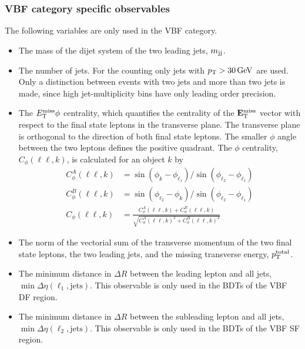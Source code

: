 \subsubsection{VBF category specific observables}
The following variables are only used in the VBF category.
\begin{itemize}
    \item The mass of the dijet system of the two leading jets, $m_{\text{jj}}$.
    \item The number of jets. For the counting only jets with $\pt > \SI{30}{\GeV}$ are used.
          Only a distinction between events with two jets and more than two jets is made, since high jet-multiplicity bins
          have only leading order precision.
    \item The $E_\text{T}^\text{miss} \phi$ centrality, which quantifies the centrality of the $\mathbf{E}_\text{T}^\text{miss}$ vector with respect to the final
          state leptons in the transverse plane.
          The transverse plane is orthogonal to the direction of both final state leptons. The smaller $\phi$ angle between
          the two leptons defines the positive quadrant.
          The $\phi$ centrality, $C_\phi(\ell\ell,k)$, is calculated for an object $k$ by~\cite{SchilloPhd}
          \begin{align}
              C_\phi^A(\ell\ell,k) &= \sin(\phi_k - \phi_{\ell_1}) / \sin(\phi_{\ell_2} - \phi_{\ell_1}) \\
              C_\phi^B(\ell\ell,k) &= \sin(\phi_{\ell_2} - \phi_k) / \sin(\phi_{\ell_2} - \phi_{\ell_1}) \\
              C_\phi(\ell\ell,k) &=  \frac{C_\phi^A(\ell\ell,k) + C_\phi^B(\ell\ell,k)}{\sqrt{C_\phi^A{(\ell\ell,k)}^2 + C_\phi^B{(\ell\ell,k)}^2}}
          \end{align}
    \item The norm of the vectorial sum of the transverse momentum of the two final state leptons, the two leading jets, and the missing transverse energy, $p_\text{T}^\text{total}$.
    \item The minimum distance in $\Delta R$ between the leading lepton and all jets, $\min \Delta \eta (\ell_1, \text{jets})$.
            This observable is only used in the BDTs of the VBF DF region.
    \item The minimum distance in $\Delta R$ between the subleading lepton and all jets, $\min \Delta \eta (\ell_2, \text{jets})$.
            This observable is only used in the BDTs of the VBF SF region.
\end{itemize}

